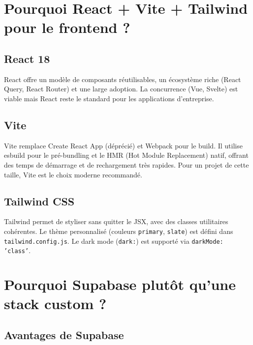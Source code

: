 \documentclass[11pt,a4paper]{report}
\begin{document}
\section{Pourquoi React + Vite + Tailwind pour le frontend ?}

\subsection{React 18}

React offre un modèle de composants réutilisables, un écosystème riche (React Query, React Router) et une large adoption. La concurrence (Vue, Svelte) est viable mais React reste le standard pour les applications d'entreprise.

\subsection{Vite}

Vite remplace Create React App (déprécié) et Webpack pour le build. Il utilise esbuild pour le pré-bundling et le HMR (Hot Module Replacement) natif, offrant des temps de démarrage et de rechargement très rapides. Pour un projet de cette taille, Vite est le choix moderne recommandé.

\subsection{Tailwind CSS}

Tailwind permet de styliser sans quitter le JSX, avec des classes utilitaires cohérentes. Le thème personnalisé (couleurs \texttt{primary}, \texttt{slate}) est défini dans \texttt{tailwind.config.js}. Le dark mode (\texttt{dark:}) est supporté via \texttt{darkMode: 'class'}.

\section{Pourquoi Supabase plutôt qu'une stack custom ?}

\subsection{Avantages de Supabase}
\end{document}
